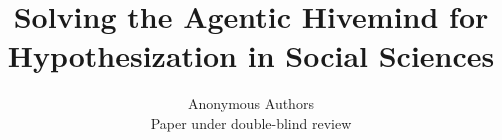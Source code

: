 \documentclass{article}
\title{Solving the Agentic Hivemind for Hypothesization in Social Sciences}
\author{
Anonymous Authors \\
Paper under double-blind review
}
\begin{document}
\maketitle

\begin{abstract}
\end{abstract}






















\appendix


\end{document}

